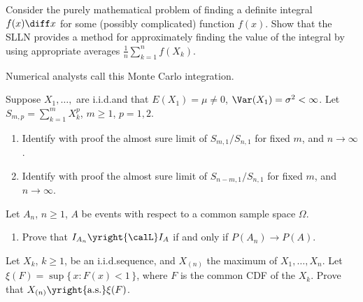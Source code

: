 \newpage

\begin{problem}
  Consider the purely mathematical problem of finding a definite integral
  \(f(x)\diff x\) for some (possibly complicated) function \(f(x)\). Show
  that the SLLN provides a method for approximately finding the value of
  the integral by using appropriate averages
  \(\frac{1}{n}\sum_{k=1}^n f(X_k)\).

  Numerical analysts call this Monte Carlo integration.
\end{problem}
\begin{solution}

\end{solution}
\newpage

\begin{problem}[DasGupta 7.4 (a), (b)]
  Suppose \(X_1,\dotsc,\) are i.i.d.\@ and that \(E(X_1)=\mu\neq 0\),
  \(\Var(X_1)=\sigma^2<\infty\). Let \(S_{m,p}=\sum_{k=1}^m X_k^p\),
  \(m\geq 1\), \(p=1,2\).
  \begin{enumerate}[label=(\alph*),noitemsep]
  \item Identify with proof the almost sure limit of \(S_{m,1}/S_{n,1}\)
    for fixed \(m\), and \(n\to\infty\).
  \item Identify with proof the almost sure limit of \(S_{n-m,1}/S_{n,1}\)
    for fixed \(m\), and \(n\to\infty\).
  \end{enumerate}
\end{problem}
\begin{solution}

\end{solution}
\newpage

\begin{problem}[DasGupta 7.5 (a)]
  Let \(A_n\), \(n\geq 1\), \(A\) be events with respect to a common sample
  space \(\Omega\).
  \begin{enumerate}[label=(\alph*),noitemsep]
  \item Prove that \(I_{A_n}\yright{\calL} I_A\) if and only if \(P(A_n)\to
    P(A)\).
  \end{enumerate}
\end{problem}
\begin{solution}

\end{solution}
\newpage

\begin{problem}
  Let \(X_k\), \(k\geq 1\), be an i.i.d.\@ sequence, and \(X_{(n)}\) the
  maximum of \(X_1,\dotsc,X_n\). Let \(\xi(F)=\sup\{\,x:F(x)<1\,\}\), where
  \(F\) is the common CDF of the \(X_k\). Prove that
  \(X_{(n)}\yright{\text{a.s.}}\xi(F)\).
\end{problem}
\begin{solution}

\end{solution}
\newpage

